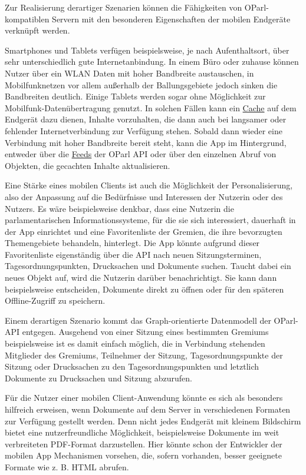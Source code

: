 \documentclass[,a4paper]{article}
\begin{document}
Zur Realisierung derartiger Szenarien können die Fähigkeiten von
OParl-kompatiblen Servern mit den besonderen Eigenschaften der mobilen
Endgeräte verknüpft werden.

Smartphones und Tablets verfügen beispielsweise, je nach Aufenthaltsort,
über sehr unterschiedlich gute Internetanbindung. In einem Büro oder
zuhause können Nutzer über ein WLAN Daten mit hoher Bandbreite
austauschen, in Mobilfunknetzen vor allem außerhalb der Ballungsgebiete
jedoch sinken die Bandbreiten deutlich. Einige Tablets werden sogar ohne
Möglichkeit zur Mobilfunk-Datenübertragung genutzt. In solchen Fällen
kann ein \hyperref[cache]{Cache} auf dem Endgerät dazu dienen, Inhalte
vorzuhalten, die dann auch bei langsamer oder fehlender
Internetverbindung zur Verfügung stehen. Sobald dann wieder eine
Verbindung mit hoher Bandbreite bereit steht, kann die App im
Hintergrund, entweder über die \hyperref[feeds]{Feeds} der OParl API
oder über den einzelnen Abruf von Objekten, die gecachten Inhalte
aktualisieren.

Eine Stärke eines mobilen Clients ist auch die Möglichkeit der
Personalisierung, also der Anpassung auf die Bedürfnisse und Interessen
der Nutzerin oder des Nutzers. Es wäre beispielsweise denkbar, dass eine
Nutzerin die parlamentarischen Informationssysteme, für die sie sich
interessiert, dauerhaft in der App einrichtet und eine Favoritenliste
der Gremien, die ihre bevorzugten Themengebiete behandeln, hinterlegt.
Die App könnte aufgrund dieser Favoritenliste eigenständig über die API
nach neuen Sitzungsterminen, Tagesordnungspunkten, Drucksachen und
Dokumente suchen. Taucht dabei ein neues Objekt auf, wird die Nutzerin
darüber benachrichtigt. Sie kann dann beispielsweise entscheiden,
Dokumente direkt zu öffnen oder für den späteren Offline-Zugriff zu
speichern.

Einem derartigen Szenario kommt das Graph-orientierte Datenmodell der
OParl-API entgegen. Ausgehend von einer Sitzung eines bestimmten
Gremiums beispielsweise ist es damit einfach möglich, die in Verbindung
stehenden Mitglieder des Gremiums, Teilnehmer der Sitzung,
Tagesordnungspunkte der Sitzung oder Drucksachen zu den
Tagesordnungspunkten und letztlich Dokumente zu Drucksachen und Sitzung
abzurufen.

Für die Nutzer einer mobilen Client-Anwendung könnte es sich als
besonders hilfreich erweisen, wenn Dokumente auf dem Server in
verschiedenen Formaten zur Verfügung gestellt werden. Denn nicht jedes
Endgerät mit kleinem Bildschirm bietet eine nutzerfreundliche
Möglichkeit, beispielsweise Dokumente im weit verbreiteten PDF-Format
darzustellen. Hier könnte schon der Entwickler der mobilen App
Mechanismen vorsehen, die, sofern vorhanden, besser geeignete Formate
wie z. B. HTML abrufen.
\end{document}
